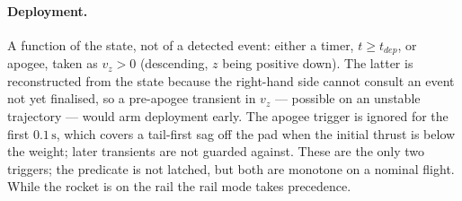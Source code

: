 \paragraph{Deployment.} A function of the state, not of a detected event: either a timer,
$t\geq t_{dep}$, or apogee, taken as $v_z>0$ (descending, $z$ being positive down). The latter is
reconstructed from the state because the right-hand side cannot consult an event not yet
finalised, so a pre-apogee transient in $v_z$ --- possible on an unstable trajectory --- would arm
deployment early. The apogee trigger is ignored for the first $0.1\,\mathrm{s}$, which covers a
tail-first sag off the pad when the initial thrust is below the weight; later transients are not
guarded against. These are the only two triggers; the predicate is not latched, but both are
monotone on a nominal flight. While the rocket is on the rail the rail mode takes precedence.

